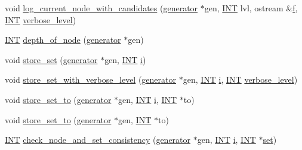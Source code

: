 \begin{DoxyCompactItemize}
\item 
void \mbox{\hyperlink{classoracle_af54e0dc5a80b11489a5335006f33ca63}{log\+\_\+current\+\_\+node\+\_\+with\+\_\+candidates}} (\mbox{\hyperlink{classgenerator}{generator}} $\ast$gen, \mbox{\hyperlink{galois_8h_a09fddde158a3a20bd2dcadb609de11dc}{I\+NT}} lvl, ostream \&\mbox{\hyperlink{alphabet2_8_c_a362077c979b0bb65159c603270e40f70}{f}}, \mbox{\hyperlink{galois_8h_a09fddde158a3a20bd2dcadb609de11dc}{I\+NT}} \mbox{\hyperlink{simeon_8_c_a818073fbcc2f439e7c56952f67386122}{verbose\+\_\+level}})
\item 
\mbox{\hyperlink{galois_8h_a09fddde158a3a20bd2dcadb609de11dc}{I\+NT}} \mbox{\hyperlink{classoracle_a022e34d01ca887785e17c9f3fb25193e}{depth\+\_\+of\+\_\+node}} (\mbox{\hyperlink{classgenerator}{generator}} $\ast$gen)
\item 
void \mbox{\hyperlink{classoracle_abbf5fae543cb81c13c03282968faf9ad}{store\+\_\+set}} (\mbox{\hyperlink{classgenerator}{generator}} $\ast$gen, \mbox{\hyperlink{galois_8h_a09fddde158a3a20bd2dcadb609de11dc}{I\+NT}} \mbox{\hyperlink{alphabet2_8_c_acb559820d9ca11295b4500f179ef6392}{i}})
\item 
void \mbox{\hyperlink{classoracle_af83a814a952e0948650850c980072a15}{store\+\_\+set\+\_\+with\+\_\+verbose\+\_\+level}} (\mbox{\hyperlink{classgenerator}{generator}} $\ast$gen, \mbox{\hyperlink{galois_8h_a09fddde158a3a20bd2dcadb609de11dc}{I\+NT}} \mbox{\hyperlink{alphabet2_8_c_acb559820d9ca11295b4500f179ef6392}{i}}, \mbox{\hyperlink{galois_8h_a09fddde158a3a20bd2dcadb609de11dc}{I\+NT}} \mbox{\hyperlink{simeon_8_c_a818073fbcc2f439e7c56952f67386122}{verbose\+\_\+level}})
\item 
void \mbox{\hyperlink{classoracle_a4489d03d342f31d1e64632ce4d0e700d}{store\+\_\+set\+\_\+to}} (\mbox{\hyperlink{classgenerator}{generator}} $\ast$gen, \mbox{\hyperlink{galois_8h_a09fddde158a3a20bd2dcadb609de11dc}{I\+NT}} \mbox{\hyperlink{alphabet2_8_c_acb559820d9ca11295b4500f179ef6392}{i}}, \mbox{\hyperlink{galois_8h_a09fddde158a3a20bd2dcadb609de11dc}{I\+NT}} $\ast$to)
\item 
void \mbox{\hyperlink{classoracle_a2362d250f6497a78f842be427ddba723}{store\+\_\+set\+\_\+to}} (\mbox{\hyperlink{classgenerator}{generator}} $\ast$gen, \mbox{\hyperlink{galois_8h_a09fddde158a3a20bd2dcadb609de11dc}{I\+NT}} $\ast$to)
\item 
\mbox{\hyperlink{galois_8h_a09fddde158a3a20bd2dcadb609de11dc}{I\+NT}} \mbox{\hyperlink{classoracle_aef948ef06e8bd1a94863ad70f053adaa}{check\+\_\+node\+\_\+and\+\_\+set\+\_\+consistency}} (\mbox{\hyperlink{classgenerator}{generator}} $\ast$gen, \mbox{\hyperlink{galois_8h_a09fddde158a3a20bd2dcadb609de11dc}{I\+NT}} \mbox{\hyperlink{alphabet2_8_c_acb559820d9ca11295b4500f179ef6392}{i}}, \mbox{\hyperlink{galois_8h_a09fddde158a3a20bd2dcadb609de11dc}{I\+NT}} $\ast$\mbox{\hyperlink{nauty_8h_a9690bea211101f22a5e154087590c3da}{set}})

\end{DoxyCompactItemize}
